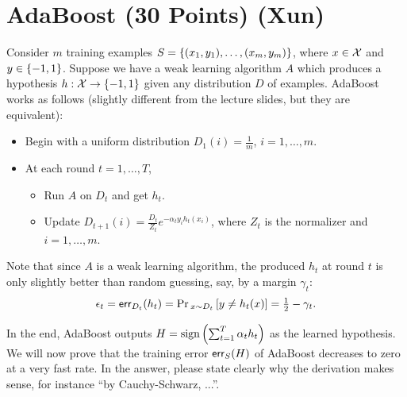 \section{AdaBoost (30 Points) (Xun)}

Consider $ m $ training examples $ S = \left\lbrace (x_1,y_1), \dotsc, (x_m, y_m) \right\rbrace $, where $ x \in \mathcal{X}$ and  $ y \in \left\lbrace -1, 1 \right\rbrace $. 
Suppose we have a weak learning algorithm $ A $ which produces a hypothesis $ h: \mathcal{X} \to \left\lbrace -1,1 \right\rbrace $ given any distribution $ D $ of examples. 
AdaBoost works as follows (slightly different from the lecture slides, but they are equivalent):
\begin{itemize}
\item 
Begin with a uniform distribution $ D_1(i) = \frac{1}{m} $, $ i = 1, \dotsc, m $.

\item 
At each round $ t = 1, \dots, T $,
\begin{itemize}
\item 
Run $ A $ on $ D_t $ and get $ h_t $. 

\item 
Update 
$ D_{t+1}(i) = \frac{D_t}{Z_t} e^{- \alpha_t y_i h_t(x_i)} $, 
where $ Z_t $ is the normalizer and $ i = 1, \dotsc, m $.
\end{itemize}

\end{itemize}

Note that since $ A $ is a weak learning algorithm, the produced $ h_t $ at round $ t $ is only slightly better than random guessing, say, by a margin $ \gamma_t $:
\begin{align}
\epsilon_t 
= \mathsf{err}_{D_t} (h_t) 
= \Pr\textstyle_{x \sim D_t} \left[ y \ne h_t(x) \right]
= \frac{1}{2} - \gamma_t.
\end{align}

In the end, AdaBoost outputs $ H = \mathop{\mathrm{sign}} \left( \sum_{t=1}^{T} \alpha_t h_t \right) $ as the learned hypothesis. 
We will now prove that the training error $ \mathsf{err}_S(H) $ of AdaBoost decreases to zero at a very fast rate. 
In the answer, please state clearly why the derivation makes sense, for instance ``by Cauchy-Schwarz, ...''. 



